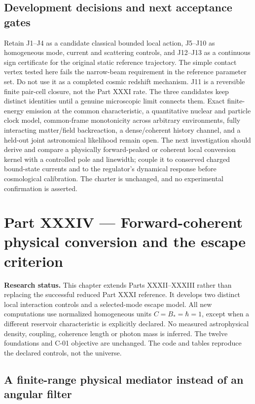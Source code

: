 \documentclass[
  11pt,
  twoside]{article}
\begin{document}
\subsection{Development decisions and next acceptance
gates}\label{development-decisions-and-next-acceptance-gates}

Retain J1--J4 as a candidate classical bounded local action, J5--J10 as
homogeneous mode, current and scattering controls, and J12--J13 as a
continuous sign certificate for the original static reference
trajectory. The simple contact vertex tested here fails the narrow-beam
requirement in the reference parameter set. Do not use it as a completed
cosmic redshift mechanism. J11 is a reversible finite pair-cell closure,
not the Part XXXI rate. The three candidates keep distinct identities
until a genuine microscopic limit connects them. Exact finite-energy
emission at the common characteristic, a quantitative nuclear and
particle clock model, common-frame monotonicity across arbitrary
environments, fully interacting matter/field backreaction, a
dense/coherent history channel, and a held-out joint astronomical
likelihood remain open. The next investigation should derive and compare
a physically forward-peaked or coherent local conversion kernel with a
controlled pole and linewidth; couple it to conserved charged
bound-state currents and to the regulator's dynamical response before
cosmological calibration. The charter is unchanged, and no experimental
confirmation is asserted.

\section{Part XXXIV --- Forward-coherent physical conversion and the
escape
criterion}\label{part-xxxiv-forward-coherent-physical-conversion-and-the-escape-criterion}

\textbf{Research status.} This chapter extends Parts XXXII--XXXIII
rather than replacing the successful reduced Part XXXI reference. It
develops two distinct local interaction controls and a selected-mode
escape model. All new computations use normalized homogeneous units
\(C=B_*=\hbar=1\), except when a different reservoir characteristic is
explicitly declared. No measured astrophysical density, coupling,
coherence length or photon mass is inferred. The twelve foundations and
C-01 objective are unchanged. The code and tables reproduce the declared
controls, not the universe.

\subsection{A finite-range physical mediator instead of an angular
filter}\label{a-finite-range-physical-mediator-instead-of-an-angular-filter}
\end{document}
